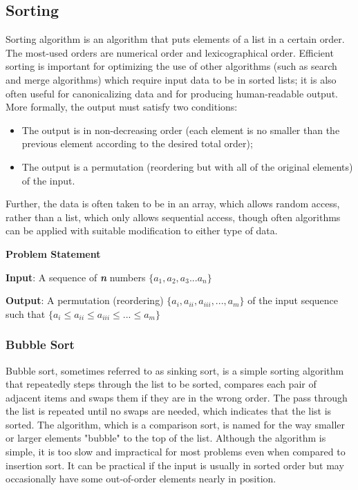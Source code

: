 \documentclass[12pt,a4paper]{book}
\begin{document}
\subsection{Sorting}
Sorting algorithm is an algorithm that puts elements of a list in a certain order. The most-used orders are numerical order and lexicographical order. Efficient sorting is important for optimizing the use of other algorithms (such as search and merge algorithms) which require input data to be in sorted lists; it is also often useful for canonicalizing data and for producing human-readable output. More formally, the output must satisfy two conditions:
\begin{itemize}
\item  The output is in non-decreasing order (each element is no smaller than the previous element according to the desired total order);
\item The output is a permutation (reordering but with all of the original elements) of the input.
\end{itemize}
\noindent\par Further, the data is often taken to be in an array, which allows random access, rather than a list, which only allows sequential access, though often algorithms can be applied with suitable modification to either type of data.\par
\noindent\textbf {Problem Statement} \par
\textbf{Input}: A sequence of \textbf{\textit{n}} numbers $\{a_{1} , a_{2} , a_{3} ... a_{n} \}$\par 
\textbf{Output}: A permutation (reordering) $\{ a_{i}, a_{ii}, a_{iii}, ..., a_{m} \}$ of the input sequence such that $\{ a_{i} \leq a_{ii} \leq a_{iii} \leq ... \leq a_{m} \}$
\subsubsection{Bubble Sort}
Bubble sort, sometimes referred to as sinking sort, is a simple sorting algorithm that repeatedly steps through the list to be sorted, compares each pair of adjacent items and swaps them if they are in the wrong order. The pass through the list is repeated until no swaps are needed, which indicates that the list is sorted. The algorithm, which is a comparison sort, is named for the way smaller or larger elements "bubble" to the top of the list. Although the algorithm is simple, it is too slow and impractical for most problems even when compared to insertion sort. It can be practical if the input is usually in sorted order but may occasionally have some out-of-order elements nearly in position.\\
\end{document}
